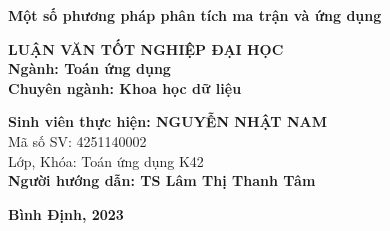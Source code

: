 \documentclass[12pt,a4paper,oneside]{report}
\numberwithin{equation}{section}
\begin{document}
\vskip 3cm
\begin{center}
{\bf\fontsize{22pt}{22}\selectfont Một số phương pháp phân tích ma trận và ứng dụng}



\vskip 3.5cm
{\bf\fontsize{16pt}{22}\selectfont LUẬN VĂN TỐT NGHIỆP ĐẠI HỌC}\\
\vskip 0.5cm
{\bf\fontsize{16pt}{22}\selectfont Ngành: Toán ứng dụng}\\
\vskip 0.05cm
{\bf\fontsize{16pt}{22}\selectfont Chuyên ngành: Khoa học dữ liệu}\\
\vskip 2.5cm
\end{center}
\begin{flushleft}
{\bf\fontsize{16pt}{22}\selectfont Sinh viên thực hiện:  NGUYỄN NHẬT NAM}\\
\vskip 0.05cm
{\fontsize{16pt}{22}\selectfont Mã số SV: 4251140002}\\
\vskip 0.05cm
{\fontsize{16pt}{22}\selectfont Lớp, Khóa: Toán ứng dụng K42}\\
\vskip 2cm
{\bf\fontsize{16pt}{22}\selectfont Người hướng dẫn: TS Lâm Thị Thanh Tâm}\\
\end{flushleft}


\vfill
\begin{center}
	{\bf\fontsize{14pt}{16pt}\selectfont Bình Định, 2023}
\end{center}
%
%	
%
%
\end{document}
